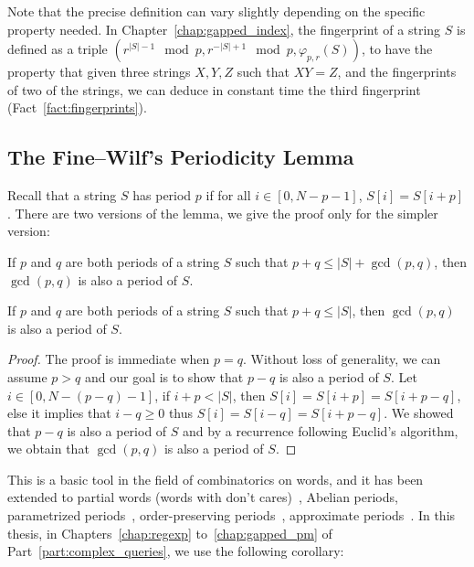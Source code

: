 Note that the precise definition can vary slightly depending on the specific property needed. In Chapter~\ref{chap:gapped_index}, the fingerprint of a string $S$ is defined as a triple $(r^{|S|-1} \mod p, r^{-|S|+1} \mod p, \varphi_{p,r}(S))$, to have the property that given three strings $X,Y,Z$ such that $XY =Z$, and the fingerprints of two of the strings, we can deduce in constant time the third fingerprint (Fact~\ref{fact:fingerprints}). 


\subsection{The Fine--Wilf's Periodicity Lemma}\label{sec:prelim:FW}

Recall that a string $S$ has period $p$ if for all $i \in [0,N-p-1]$, $S[i]=S[i+p]$. There are two versions of the lemma, we give the proof only for the simpler version:

\begin{lemma*}
If $p$ and $q$ are both periods of a string $S$ such that $p+q \leq |S|+\gcd(p,q)$, then $\gcd(p,q)$ is also a period of $S$.
\end{lemma*}

\begin{lemma*}
    If $p$ and $q$ are both periods of a string $S$ such that $p+q \leq |S|$, then $\gcd(p,q)$ is also a period of $S$.
\end{lemma*}
\begin{proof}
    The proof is immediate when $p=q$. Without loss of generality, we can assume $p > q$ and our goal is to show that $p-q$ is also a period of $S$. Let $i\in[0,N-(p-q)-1]$, if $i+p < |S|$, then $S[i]=S[i+p]=S[i+p-q]$, else it implies that $i-q \geq 0$ thus $S[i] = S[i-q] = S[i+p-q]$. We showed that $p-q$ is also a period of $S$ and by a recurrence following Euclid's algorithm, we obtain that $\gcd(p,q)$ is also a period of $S$.
\end{proof}


This is a basic tool in the field of combinatorics on words, and it has been extended to partial words (words with don't cares)~\cite{Berstel1999,Blanchet-Sadri2008,Blanchet-Sadri2002,Shur2004,Shur2001,Idiatulina2014,Kociumaka2022},
Abelian periods\cite{Constantinescu2006,Blanchet-Sadri2013}, parametrized periods~\cite{Apostolico2008},
order-preserving periods~\cite{Matsuoka2016,GOURDEL2020104463}, approximate periods~\cite{AmirICALP2010,Amir2012,AMIR2015215}.
In this thesis, in Chapters~\ref{chap:regexp} to~\ref{chap:gapped_pm} of Part~\ref{part:complex_queries}, we use the following corollary:

